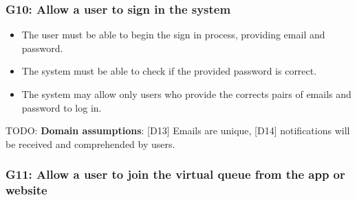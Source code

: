 \subsubsection{G10: Allow a user to sign in the system}
\label{subsubsect:G10}

\begin{itemize}[topsep=0pt]
    \item The user must be able to begin the sign in process, providing email and password.
    \item The system must be able to check if the provided password is correct.
    \item The system may allow only users who provide the corrects pairs of emails and password to log in.
\end{itemize}

TODO: \textbf{Domain assumptions}: [D13] Emails are unique, [D14] notifications will be received and comprehended by users.

\subsubsection{G11: Allow a user to join the virtual queue from the app or website}
\label{subsubsect:G11}

